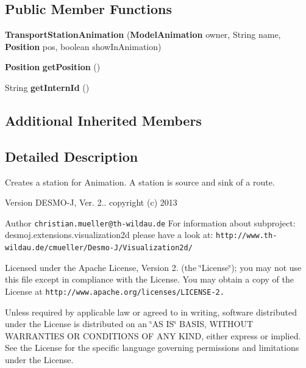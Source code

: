 \subsection*{Public Member Functions}
\begin{DoxyCompactItemize}
\item 
{\bf Transport\-Station\-Animation} ({\bf Model\-Animation} owner, String name, {\bf Position} pos, boolean show\-In\-Animation)
\item 
{\bf Position} {\bfseries get\-Position} ()\label{classdesmoj_1_1extensions_1_1visualization2d_1_1animation_1_1transport_1_1_transport_station_animation_a8ee4ebe05c9b247e91511c0a91b44076}

\item 
String {\bfseries get\-Intern\-Id} ()\label{classdesmoj_1_1extensions_1_1visualization2d_1_1animation_1_1transport_1_1_transport_station_animation_a491b823641f28ee2ff4788b9f72c84a8}

\end{DoxyCompactItemize}
\subsection*{Additional Inherited Members}


\subsection{Detailed Description}
Creates a station for Animation. A station is source and sink of a route.

\begin{DoxyVersion}{Version}
D\-E\-S\-M\-O-\/\-J, Ver. 2.. copyright (c) 2013 
\end{DoxyVersion}
\begin{DoxyAuthor}{Author}
{\tt christian.\-mueller@th-\/wildau.\-de} For information about subproject\-: desmoj.\-extensions.\-visualization2d please have a look at\-: {\tt http\-://www.\-th-\/wildau.\-de/cmueller/\-Desmo-\/\-J/\-Visualization2d/}
\end{DoxyAuthor}
Licensed under the Apache License, Version 2. (the \char`\"{}\-License\char`\"{}); you may not use this file except in compliance with the License. You may obtain a copy of the License at {\tt http\-://www.\-apache.\-org/licenses/\-L\-I\-C\-E\-N\-S\-E-\/2.}

Unless required by applicable law or agreed to in writing, software distributed under the License is distributed on an \char`\"{}\-A\-S I\-S\char`\"{} B\-A\-S\-I\-S, W\-I\-T\-H\-O\-U\-T W\-A\-R\-R\-A\-N\-T\-I\-E\-S O\-R C\-O\-N\-D\-I\-T\-I\-O\-N\-S O\-F A\-N\-Y K\-I\-N\-D, either express or implied. See the License for the specific language governing permissions and limitations under the License. 

